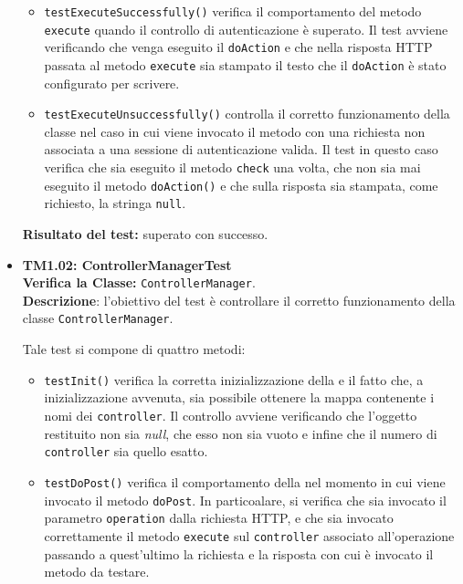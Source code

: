\begin{itemize}
\begin{itemize}
\item \texttt{testExecuteSuccessfully()} verifica il comportamento del metodo \texttt{execute} quando il controllo di autenticazione è superato. Il test avviene verificando che venga eseguito il \texttt{doAction} e che nella risposta HTTP passata al metodo \texttt{execute} sia  stampato il testo che il \texttt{doAction} è stato configurato per scrivere.

\item \texttt{testExecuteUnsuccessfully()}
controlla il corretto funzionamento della classe nel caso in cui viene invocato il metodo con una richiesta non associata a una sessione di autenticazione valida.
Il test in questo caso verifica che sia eseguito il metodo \texttt{check} una volta, che non sia mai eseguito il metodo \texttt{doAction()} e che sulla risposta sia stampata, come richiesto, la stringa \texttt{null}.


 \end{itemize}
\textbf{Risultato del test:} superato con successo.



\item \textbf{TM1.02: ControllerManagerTest}\\
\textbf{Verifica la Classe:} \texttt{ControllerManager}.\\
\textbf{Descrizione}: l'obiettivo del test è controllare il corretto funzionamento della classe \texttt{ControllerManager}.
 
Tale test si compone di quattro metodi:
 \begin{itemize}
 
\item \texttt{testInit()} verifica la corretta inizializzazione della  e il fatto che, a inizializzazione avvenuta, sia possibile ottenere la mappa contenente i nomi dei \texttt{controller}. Il controllo avviene verificando che l'oggetto restituito non sia \textsl{null}, che esso non sia vuoto e infine che il numero di \texttt{controller} sia quello esatto.

\item \texttt{testDoPost()} verifica il comportamento della  nel momento in cui viene invocato il metodo \texttt{doPost}. In particoalare, si verifica che sia invocato il parametro \texttt{operation} dalla richiesta HTTP, e che sia invocato correttamente il metodo \texttt{execute} sul \texttt{controller} associato all'operazione passando a quest'ultimo la richiesta e la risposta con cui è invocato il metodo da testare. 


\end{itemize}
\end{itemize}
